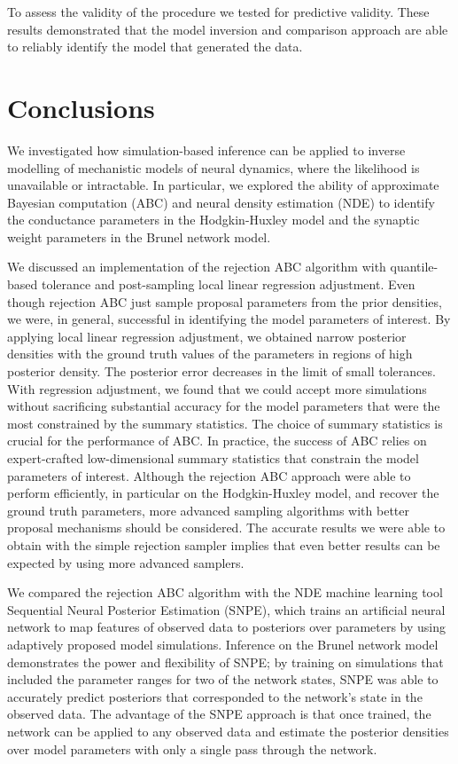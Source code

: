 To assess the validity of the procedure we tested for predictive validity. These results demonstrated that the model inversion and comparison approach are able to reliably identify the model that generated the data. 

\chapter{Conclusions}\label{chap:conclusions}

We investigated how simulation-based inference can be applied to inverse modelling of mechanistic models of neural dynamics, where the likelihood is unavailable or intractable. In particular, we explored the ability of approximate Bayesian computation (ABC) and neural density estimation (NDE) to identify the conductance parameters in the Hodgkin-Huxley model and the synaptic weight parameters in the Brunel network model. 

We discussed an implementation of the rejection ABC algorithm with quantile-based tolerance and post-sampling local linear regression adjustment. Even though rejection ABC just sample proposal parameters from the prior densities, we were, in general, successful in identifying the model parameters of interest. By applying local linear regression adjustment, we obtained narrow posterior densities with the ground truth values of the parameters in regions of high posterior density. The posterior error decreases in the limit of small tolerances. With regression adjustment, we found that we could accept more simulations without sacrificing substantial accuracy for the model parameters that were the most constrained by the summary statistics. The choice of summary statistics is crucial for the performance of ABC. In practice, the success of ABC relies on expert-crafted low-dimensional summary statistics that constrain the model parameters of interest. Although the rejection ABC approach were able to perform efficiently, in particular on the Hodgkin-Huxley model, and recover the ground truth parameters, more advanced sampling algorithms with better proposal mechanisms should be considered. The accurate results we were able to obtain with the simple rejection sampler implies that even better results can be expected by using more advanced samplers. 

We compared the rejection ABC algorithm with the NDE machine learning tool Sequential Neural Posterior Estimation (SNPE), which trains an artificial neural network to map features of observed data to posteriors over parameters by using adaptively proposed model simulations. Inference on the Brunel network model demonstrates the power and flexibility of SNPE; by training on simulations that included the parameter ranges for two of the network states, SNPE was able to accurately predict posteriors that corresponded to the network's state in the observed data. The advantage of the SNPE approach is that once trained, the network can be applied to any observed data and estimate the posterior densities over model parameters with only a single pass through the network. 


